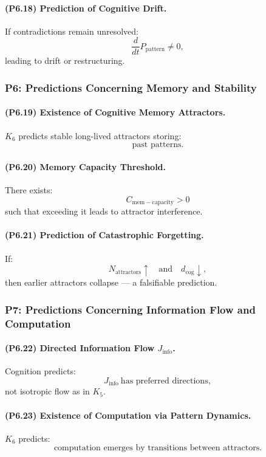 \paragraph{(P6.18) Prediction of Cognitive Drift.}
If contradictions remain unresolved:
\[
\frac{d}{dt} P_{\mathrm{pattern}} \neq 0,
\]
leading to drift or restructuring.

\subsubsection{P6: Predictions Concerning Memory and Stability}

\paragraph{(P6.19) Existence of Cognitive Memory Attractors.}
$K_6$ predicts stable long-lived attractors storing:
\[
\text{past patterns}.
\]

\paragraph{(P6.20) Memory Capacity Threshold.}
There exists:
\[
C_{\mathrm{mem-capacity}} > 0
\]
such that exceeding it leads to attractor interference.

\paragraph{(P6.21) Prediction of Catastrophic Forgetting.}
If:
\[
N_{\mathrm{attractors}} \uparrow \quad \text{and} \quad d_{\mathrm{cog}} \downarrow,
\]
then earlier attractors collapse — a falsifiable prediction.

\subsubsection{P7: Predictions Concerning Information Flow and Computation}

\paragraph{(P6.22) Directed Information Flow $J_{\mathrm{info}}$.}
Cognition predicts:
\[
J_{\mathrm{info}} \ \text{has preferred directions},
\]
not isotropic flow as in $K_5$.

\paragraph{(P6.23) Existence of Computation via Pattern Dynamics.}
$K_6$ predicts:
\[
\text{computation emerges by transitions between attractors}.
\]

